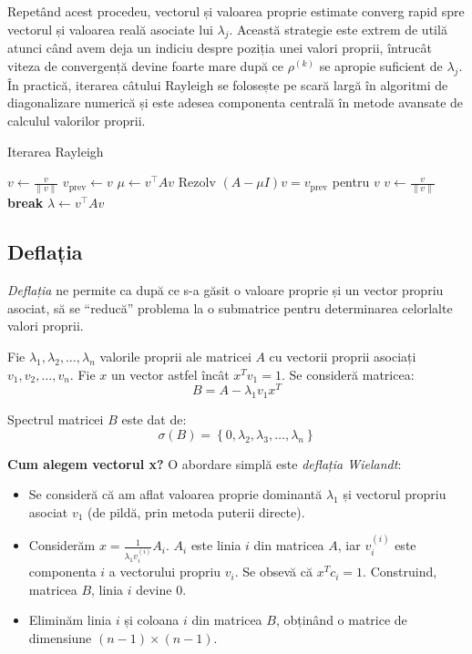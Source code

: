 \documentclass{exam}
\begin{document}
Repetând acest procedeu, vectorul și valoarea proprie estimate converg rapid
spre vectorul și valoarea reală asociate lui $\lambda_j$. Această strategie este
extrem de utilă atunci când avem deja un indiciu despre poziția unei valori
proprii, întrucât viteza de convergență devine foarte mare după ce $\rho^{(k)}$
se apropie suficient de $\lambda_j$. În practică, iterarea câtului Rayleigh se
folosește pe scară largă în algoritmi de diagonalizare numerică și este adesea
componenta centrală în metode avansate de calculul valorilor proprii.

\begin{algorithm}
	\caption{Iterarea Rayleigh}
	\begin{algorithmic}[1]
		\State \( v \gets \frac{v}{\|v\|} \)
		\State \( v_{\text{prev}} \gets v \)
		\State \( \mu \gets v^\top A v \)
		\State Rezolv \( (A - \mu I) v = v_{\text{prev}} \) pentru \( v \)
		\State \( v \gets \frac{v}{\|v\|} \)
		\State \textbf{break}
		\EndIf
		\EndFor
		\State \( \lambda \gets v^\top A v \)
	\end{algorithmic}
\end{algorithm}

\subsection{Deflația}

\textit{Deflația} ne permite ca după ce s-a găsit o valoare proprie și un vector
propriu asociat, să se “reducă” problema la o submatrice pentru determinarea
celorlalte valori proprii.

Fie $\lambda_1, \lambda_2, \ldots, \lambda_n$ valorile proprii ale matricei $A$
cu vectorii proprii asociați $v_1, v_2, \ldots, v_n$. Fie $x$ un vector astfel
încât $x^T v_1 = 1$. Se consideră matricea:
\begin{equation*}
	B = A - \lambda_1 v_1 x^T
\end{equation*}

Spectrul matricei $B$ este dat de:
\begin{equation*}
	\sigma(B) = \left\lbrace 0, \lambda_2, \lambda_3, \ldots, \lambda_n \right\rbrace
\end{equation*}

\textbf{Cum alegem vectorul x?} O abordare simplă este \textit{deflația Wielandt}:

\begin{itemize}
	\item Se consideră că am aflat valoarea proprie dominantă $\lambda_1$ și
	      vectorul propriu asociat $v_1$ (de pildă, prin metoda puterii directe).
	\item Considerăm $x = \frac{1}{\lambda_1 v_i^{(i)}} A_i$. $A_i$ este linia
	      $i$ din matricea $A$, iar $v_i^{(i)}$ este componenta $i$ a vectorului
	      propriu $v_i$. Se obsevă că $x^T c_i = 1$. Construind, matricea $B$,
	      linia $i$ devine $0$.
	\item Eliminăm linia $i$ și coloana $i$ din matricea $B$, obținând o
	      matrice de dimensiune $(n-1) \times (n-1)$.
\end{itemize}
\end{document}
